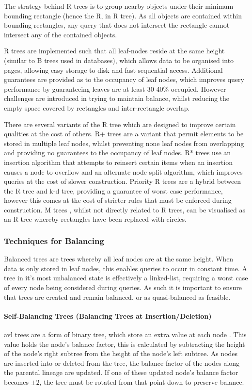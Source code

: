       The strategy behind R trees is to group nearby objects under their minimum bounding rectangle (hence the R, in R tree). As all objects are contained within bounding rectangles, any query that does not intersect the rectangle cannot intersect any of the contained objects.
      
      R trees are implemented such that all leaf-nodes reside at the same height (similar to B trees used in databases), which allows data to be organised into pages, allowing easy storage to disk and fast sequential access. Additional guarantees are provided as to the occupancy of leaf nodes, which improves query performance by guaranteeing leaves are at least 30-40\% occupied. However challenges are introduced in trying to maintain balance, whilst reducing the empty space covered by rectangles and inter-rectangle overlap.
      
      There are several variants of the R tree which are designed to improve certain qualities at the cost of others. R+ trees \cite{SRF87} are a variant that permit elements to be stored in multiple leaf nodes, whilst preventing none leaf nodes from overlapping and providing no guarantees to the occupancy of leaf nodes. R* trees \cite{BK*90} use an insertion algorithm that attempts to reinsert certain items when an insertion causes a node to overflow and an alternate node split algorithm, which improves queries at the cost of slower construction. Priority R trees \cite{AB*04} are a hybrid between the R tree and k-d tree, providing a guarantee of worst case performance, however this comes at the cost of stricter rules that must be enforced during construction. M trees \cite{PCZ97}, whilst not directly related to R trees, can be visualised as an R tree whereby rectangles have been replaced with circles.

    \subsubsection*{Techniques for Balancing}
      Balanced trees are trees whereby all leaf nodes are at the same height. When data is only stored in leaf nodes, this enables queries to occur in constant time. A tree in it's most unbalanced state is effectively a linked-list, requiring a worst case of every node being considered during queries. As such it is important to ensure that trees are created and remain balanced, or as quasi-balanced as feasible.
      
      \paragraph*{Self-Balancing Trees (Balancing Trees at Insertion/Deletion)}
        \gls{avl} trees are a form of binary tree, which store an extra value at each node \cite{AVL63}. This value holds the node's balance factor, this is calculated by subtracting the height of the node's right subtree from the height of the node's left subtree. As nodes are inserted into or deleted from the tree, the balance factor of the nodes along the parental lineage are updated. If one of these updated node's balance factor becomes $\pm 2$, the tree must be rotated from that point down to preserve balance.
        
